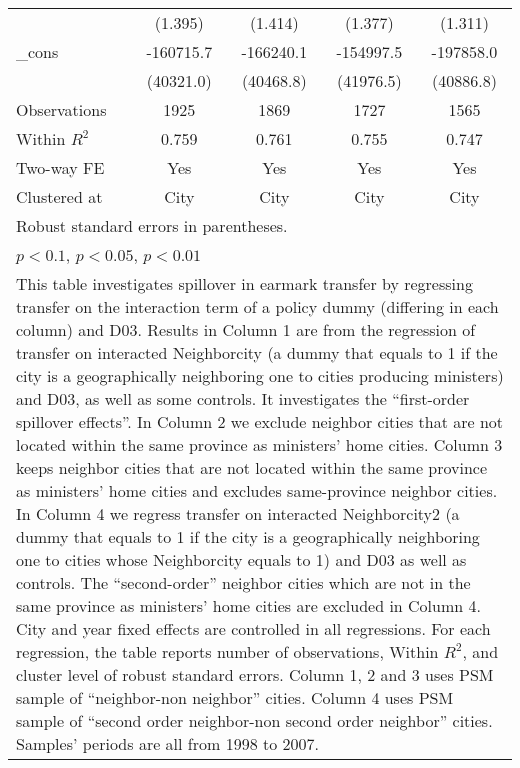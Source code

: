 \documentclass[11pt,a4paper]{article}
\begin{document}
\begin{center}
\begin{scriptsize}
{\begin{tabular}{l*{4}{c}}
            &     (1.395)         &     (1.414)      &     (1.377)       &      (1.311)        \\
[1em]
\_cons      &   -160715.7\sym{***}&   -166240.1\sym{***}&   -154997.5\sym{***}  &   -197858.0\sym{***} \\
            &   (40321.0)         &   (40468.8)    &   (41976.5)      &   (40886.8)      \\
\hline
Observations       &        1925         &        1869      &        1727        &        1565         \\
Within $R^{2}$      &       0.759         &       0.761  &       0.755         &      0.747       \\
Two-way FE    &    Yes    &   Yes   & Yes    &   Yes   \\
Clustered at     &        City         &        City    & City     &        City       \\
\hline\hline
\multicolumn{5}{l}{\footnotesize Robust standard errors in parentheses.}\\
\multicolumn{5}{l}{\footnotesize \sym{*} \(p<0.1\), \sym{**} \(p<0.05\), \sym{***} \(p<0.01\)}\\
\multicolumn{5}{p{10.8cm}}{\footnotesize This table investigates spillover in earmark transfer by regressing transfer on the interaction term of a policy dummy (differing in each column) and D03. Results in Column 1 are from the regression of transfer on interacted Neighborcity (a dummy that equals to 1 if the city is a geographically neighboring one to cities producing ministers) and D03, as well as some controls. It investigates the ``first-order spillover effects''. In Column 2 we exclude neighbor cities that are not located within the same province as ministers' home cities. Column 3 keeps neighbor cities that are not located within the same province as ministers' home cities and excludes same-province neighbor cities. In Column 4 we regress transfer on interacted Neighborcity2 (a dummy that equals to 1 if the city is a geographically neighboring one to cities whose Neighborcity equals to 1) and D03 as well as controls. The ``second-order'' neighbor cities which are not in the same province as ministers' home cities are excluded in Column 4. City and year fixed effects are controlled in all regressions. For each regression, the table reports number of observations, Within $R^{2}$, and cluster level of robust standard errors. Column 1, 2 and 3 uses PSM sample of ``neighbor-non neighbor'' cities. Column 4 uses PSM sample of ``second order neighbor-non second order neighbor'' cities. Samples' periods are all from 1998 to 2007. }\\
\end{tabular}
}
\end{scriptsize}
\end{center}
\end{document}
